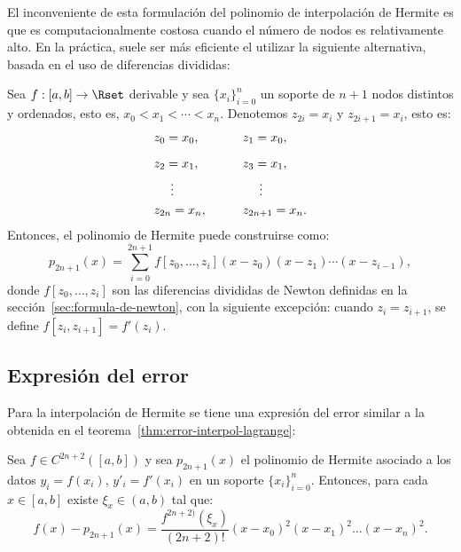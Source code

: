      El inconveniente de esta formulación del polinomio de interpolación de
     Hermite es que es computacionalmente costosa cuando el número de nodos
     es relativamente alto. En la práctica, suele ser más eficiente el
     utilizar la siguiente alternativa, basada en el uso de diferencias
     divididas:


     \begin{theorem}
       \label{thm:formula-newton-hermite}
       Sea $f:[a,b]\to\Rset$ derivable y sea $\{x_i\}_{i=0}^n$ un soporte
       de $n+1$ nodos distintos y ordenados, esto es,
       $x_0<x_1<\cdots<x_n$. Denotemos $z_{2i}=x_i$ y $z_{2i+1}=x_i$, esto es:
       \begin{alignat*}{2} %
         &z_0=x_0, && z_1=x_0,\\\noalign{\medskip}
         &z_2=x_1, && z_3=x_1,\\
         &\ \quad\vdots & &\ \quad\vdots \\
         &z_{2n}=x_n, \qquad && z_{2n+1}=x_n.
       \end{alignat*}
       Entonces, el polinomio de Hermite puede construirse como:
       \begin{equation*}
         p_{2n+1}(x)=\sum_{i=0}^{2n+1}f[z_0,\dots,z_i]
         (x-z_0)(x-z_1)\cdots(x-z_{i-1}),
       \end{equation*}
       donde $f[z_0,\dots,z_i]$ son las diferencias divididas de Newton
       definidas en la sección~\ref{sec:formula-de-newton}, con la
       siguiente excepción: cuando $z_i=z_{i+1}$, se define
       $f[z_i,z_{i+1}]=f'(z_i)$.
     \end{theorem}

     \subsection*{Expresión del error}
     \label{sec:expresion-del-error-hermite}

     Para la interpolación de Hermite se tiene una expresión del error
     similar a la obtenida en el teorema~\ref{thm:error-interpol-lagrange}:
     \begin{theorem}
       Sea $f\in C^{2n+2}([a,b])$ y sea $p_{2n+1}(x)$ el polinomio de
       Hermite asociado a los datos $y_i=f(x_i)$, $y'_i=f'(x_i)$ en un
       soporte $\{x_i\}_{i=0}^n$. Entonces, para cada $x\in [a,b]$ existe
       $\xi_x\in (a,b)$ tal que:
       \begin{equation*}
         f(x)-p_{2n+1}(x)=\frac{f^{2n+2)}(\xi_x)}{(2n+2)!} (x-x_0)^2(x-x_1)^2\dots(x-x_n)^2.
       \end{equation*}
     \end{theorem}

